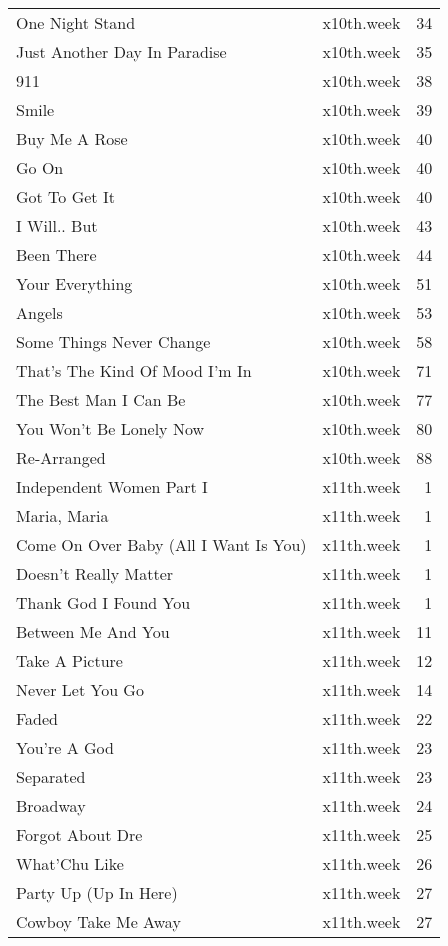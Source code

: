 \begin{table}[ht]
\begin{tabular}{llr}
  One Night Stand & x10th.week &  34 \\ 
  Just Another Day In Paradise & x10th.week &  35 \\ 
  911 & x10th.week &  38 \\ 
  Smile & x10th.week &  39 \\ 
  Buy Me A Rose & x10th.week &  40 \\ 
  Go On & x10th.week &  40 \\ 
  Got To Get It & x10th.week &  40 \\ 
  I Will.. But & x10th.week &  43 \\ 
  Been There & x10th.week &  44 \\ 
  Your Everything & x10th.week &  51 \\ 
  Angels & x10th.week &  53 \\ 
  Some Things Never Change & x10th.week &  58 \\ 
  That's The Kind Of Mood I'm In & x10th.week &  71 \\ 
  The Best Man I Can Be & x10th.week &  77 \\ 
  You Won't Be Lonely Now & x10th.week &  80 \\ 
  Re-Arranged & x10th.week &  88 \\ 
  Independent Women Part I & x11th.week &   1 \\ 
  Maria, Maria & x11th.week &   1 \\ 
  Come On Over Baby (All I Want Is You) & x11th.week &   1 \\ 
  Doesn't Really Matter & x11th.week &   1 \\ 
  Thank God I Found You & x11th.week &   1 \\ 
  Between Me And You & x11th.week &  11 \\ 
  Take A Picture & x11th.week &  12 \\ 
  Never Let You Go & x11th.week &  14 \\ 
  Faded & x11th.week &  22 \\ 
  You're A God & x11th.week &  23 \\ 
  Separated & x11th.week &  23 \\ 
  Broadway & x11th.week &  24 \\ 
  Forgot About Dre & x11th.week &  25 \\ 
  What'Chu Like & x11th.week &  26 \\ 
  Party Up (Up In Here) & x11th.week &  27 \\ 
  Cowboy Take Me Away & x11th.week &  27 \\ 

\end{tabular}
\end{table}
